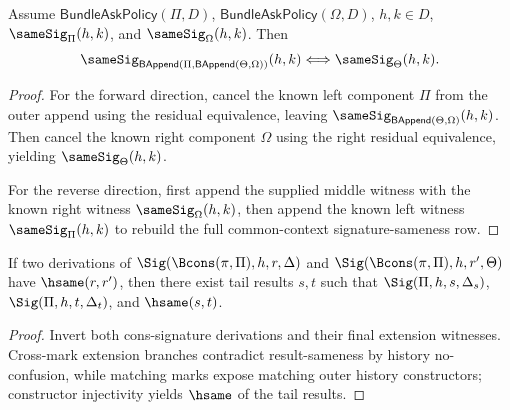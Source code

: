 \begin{theorem}
\label{thm:samesig-bundleappend-common-context-iff}
Assume $\mathsf{BundleAskPolicy}(\Pi,D)$, $\mathsf{BundleAskPolicy}(\Omega,D)$,
$h,k\in D$, $\sameSig_\Pi(h,k)$, and $\sameSig_\Omega(h,k)$. Then
$$
\sameSig_{\mathsf{BAppend}(\Pi,\mathsf{BAppend}(\Theta,\Omega))}(h,k)
\Longleftrightarrow
\sameSig_\Theta(h,k).
$$
\end{theorem}
\begin{proof}
For the forward direction, cancel the known left component $\Pi$ from the outer
append using the residual equivalence, leaving
$\sameSig_{\mathsf{BAppend}(\Theta,\Omega)}(h,k)$. Then cancel the known right
component $\Omega$ using the right residual equivalence, yielding
$\sameSig_\Theta(h,k)$.

For the reverse direction, first append the supplied middle witness with the
known right witness $\sameSig_\Omega(h,k)$, then append the known left witness
$\sameSig_\Pi(h,k)$ to rebuild the full common-context signature-sameness row.
\end{proof}

\begin{theorem}
\label{thm:signature-cons-tail-hsame-from-result-hsame}
If two derivations of \(\Sig(\Bcons(\pi,\Pi),h,r,\Delta)\) and
\(\Sig(\Bcons(\pi,\Pi),h,r',\Theta)\) have \(\hsame(r,r')\), then there exist
tail results \(s,t\) such that \(\Sig(\Pi,h,s,\Delta_s)\), \(\Sig(\Pi,h,t,\Delta_t)\), and
\(\hsame(s,t)\).
\end{theorem}
\begin{proof}
Invert both cons-signature derivations and their final extension witnesses. Cross-mark extension branches contradict result-sameness by history no-confusion, while matching marks expose matching outer history constructors; constructor injectivity yields \(\hsame\) of the tail results.
\end{proof}

